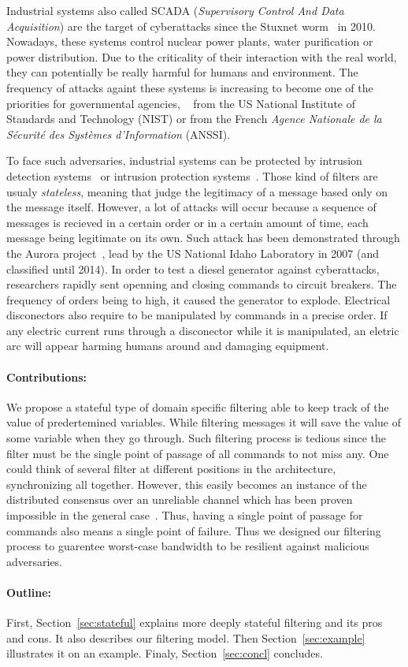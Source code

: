 Industrial systems also called SCADA (\emph{Supervisory Control And
Data Acquisition}) are the target of cyberattacks since the Stuxnet
worm~\cite{Lan11} in 2010.
Nowadays, these systems control nuclear power plants, water purification or
power distribution.
Due to the criticality of their interaction with the real world, they can
potentially be really harmful for humans and environment.
The frequency of attacks againt these systems is increasing to become one of the
priorities for governmental agencies, \eg~\cite{SFS11} from the US
National Institute of Standards and Technology (NIST) or
\cite{ANSSI12_guide_securite_industrielle_en} from the French {\em Agence
Nationale de la Sécurité des Systèmes d'Information} (ANSSI).

To face such adversaries, industrial systems can be protected by intrusion
detection systems~\cite{StoneGate13,Pax99,Suricata,Snort} or intrusion
protection systems~\cite{DESIRE10,StoneGate11,rWeb13,DZNetwork14}.
Those kind of filters are usualy {\em stateless}, meaning that judge the 
legitimacy of a message based only on the message itself.
However, a lot of attacks will occur because a sequence of messages is recieved
in a certain order or in a certain amount of time, each message being legitimate
on its own.
Such attack has been demonstrated through the Aurora project~\cite{Aurora}, lead
by the US National Idaho Laboratory in 2007 (and classified until 2014).
In order to test a diesel generator against cyberattacks, researchers rapidly 
sent openning and closing commands to circuit breakers.
The frequency of orders being to high, it caused the generator to explode.
Electrical disconectors also require to be manipulated by commands in a precise
order.
If any electric current runs through a disconector while it is manipulated, an
eletric arc will appear harming humans around and damaging equipment.

\paragraph{Contributions:} We propose a stateful type of domain specific
filtering able to keep track of the value of predertemined variables.
While filtering messages it will save the value of some variable when they go
through.
Such filtering process is tedious since the filter must be the single point of
passage of all commands to not miss any.
One could think of several filter at different positions in the architecture,
synchronizing all together.
However, this easily becomes an instance of the distributed consensus over an
unreliable channel which has been proven impossible in the general
case~\cite{FLP85}.
Thus, having a single point of passage for commands also means a single point of
failure.
Thus we designed our filtering process to guarentee worst-case bandwidth to be
resilient against malicious adversaries.


\paragraph{Outline:} First, Section~\ref{sec:stateful} explains more deeply
stateful filtering and its pros and cons.
It also describes our filtering model.
Then Section~\ref{sec:example} illustrates it on an example.
Finaly, Section~\ref{sec:concl} concludes.
